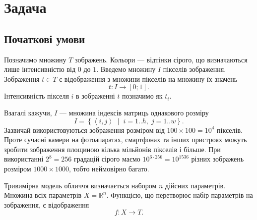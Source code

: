 \section{Задача}

\subsection{Початкові умови}

Позначимо множину $T$ зображень.
Кольори --- відтінки сірого, що визначаються лише інтенсивністю від $0$ до $1$.
Введемо множину $I$ пікселів зображення.
Зображення $t \in T$ є відображення з множини пікселів на множину їх значень
\begin{equation*}
  t: I \rightarrow \left[ 0; 1 \right].
\end{equation*}
Інтенсивність пікселя $i$ в зображенні $t$ позначимо як $t_i$.

Взагалі кажучи, $I$ --- множина індексів матриць однакового розміру
\begin{equation*}
  I = \left\{ \left\langle i, j \right\rangle
    \;\middle|\; i = 1..h,\; j = 1..w \right\}.
\end{equation*}
Зазвичай використовуються зображення розміром від
$100 \times 100 = 10^4$ пікселів.
Проте сучасні камери на фотоапаратах, смартфонах та інших пристроях
можуть зробити зображення площиною кілька мільйонів пікселів і більше.
При використанні $2^8 = 256$ градацій сірого маємо
$10^{6 \cdot 256} = 10^{1536}$ різних зображень розміром $1000 \times 1000$,
тобто неймовірно багато.

Тривимірна модель обличчя визначається набором $n$ дійсних параметрів.
Множина всіх параметрів $X = \mathbb{R}^n$.
Функцією, що перетворює набір параметрів на зображення, є відображення
\begin{equation*}
  f: X \rightarrow T.
\end{equation*}


